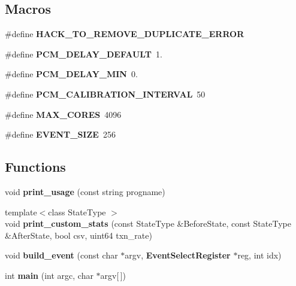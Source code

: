 \subsection*{Macros}
\begin{DoxyCompactItemize}
\item 
\#define {\bfseries H\+A\+C\+K\+\_\+\+T\+O\+\_\+\+R\+E\+M\+O\+V\+E\+\_\+\+D\+U\+P\+L\+I\+C\+A\+T\+E\+\_\+\+E\+R\+R\+OR}\label{pcm-core_8cpp_ac4eeb11d89b0f517835a12a04443ebe4}

\item 
\#define {\bfseries P\+C\+M\+\_\+\+D\+E\+L\+A\+Y\+\_\+\+D\+E\+F\+A\+U\+LT}~1.\label{pcm-core_8cpp_aa9ecc55c90c7a69729babc4f5f91ed96}

\item 
\#define {\bfseries P\+C\+M\+\_\+\+D\+E\+L\+A\+Y\+\_\+\+M\+IN}~0.\label{pcm-core_8cpp_acccbe8441d6dd75bdc949f5f0ee126c5}

\item 
\#define {\bfseries P\+C\+M\+\_\+\+C\+A\+L\+I\+B\+R\+A\+T\+I\+O\+N\+\_\+\+I\+N\+T\+E\+R\+V\+AL}~50\label{pcm-core_8cpp_a433dde946b6713059756318598c9a6fe}

\item 
\#define {\bfseries M\+A\+X\+\_\+\+C\+O\+R\+ES}~4096\label{pcm-core_8cpp_a009855593b59738d24dbfc236edb3b14}

\item 
\#define {\bfseries E\+V\+E\+N\+T\+\_\+\+S\+I\+ZE}~256\label{pcm-core_8cpp_a228783873815e02b069a286af4512aba}

\end{DoxyCompactItemize}
\subsection*{Functions}
\begin{DoxyCompactItemize}
\item 
void {\bfseries print\+\_\+usage} (const string progname)\label{pcm-core_8cpp_a4e43544978d9afb2faf08dce11cab70c}

\item 
{\footnotesize template$<$class State\+Type $>$ }\\void {\bfseries print\+\_\+custom\+\_\+stats} (const State\+Type \&Before\+State, const State\+Type \&After\+State, bool csv, uint64 txn\+\_\+rate)\label{pcm-core_8cpp_a857456f644c2e58f064fa2f70accc4dd}

\item 
void {\bfseries build\+\_\+event} (const char $\ast$argv, {\bf Event\+Select\+Register} $\ast$reg, int idx)\label{pcm-core_8cpp_ac493787fd6910618e564b9af590d4a7e}

\item 
int {\bfseries main} (int argc, char $\ast$argv[$\,$])\label{pcm-core_8cpp_a0ddf1224851353fc92bfbff6f499fa97}

\end{DoxyCompactItemize}
